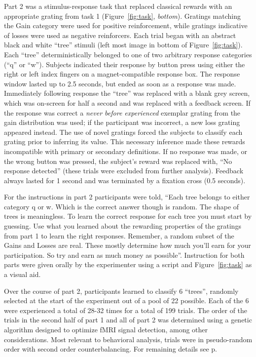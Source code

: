 \documentclass[doc,12pt]{apa}        %
\begin{document}
Part 2 was a stimulus-response task that replaced classical rewards with an appropriate grating from task 1 (Figure~\ref{fig:task}, \emph{bottom}).  Gratings matching the Gain category were used for positive reinforcement, while gratings indicative of losses were used as negative reinforcers.   Each trial began with an abstract black and white ``tree'' stimuli (left most image in bottom of Figure~\ref{fig:task}).  Each ``tree'' deterministically belonged to one of two arbitrary response categories (``q'' or ``w'').  Subjects indicated their response by button press using either the right or left index fingers on a magnet-compatible response box.  The response window lasted up to 2.5 seconds, but ended as soon as a response was made.  Immediately following response the ``tree'' was replaced with a blank grey screen, which was on-screen for half a second and was replaced with a feedback screen.  If the response was correct a \emph{never before experienced} exemplar grating from the gain distribution was used; if the participant was incorrect, a new loss grating appeared instead.  The use of novel gratings forced the subjects to classify each grating prior to inferring its value.  This necessary inference made these rewards incompatible with primary or secondary definitions.  If no response was made, or the wrong button was pressed, the subject's reward was replaced with, ``No response detected'' (these trials were excluded from further analysis).  Feedback always lasted for 1 second and was terminated by a fixation cross (0.5 seconds).  

For the instructions in part 2 participants were told, ``Each tree belongs to either category q or w.  Which is the correct answer though is random.  The shape of trees is meaningless.  To learn the correct response for each tree you must start by guessing.  Use what you learned about the rewarding properties of the gratings from part 1 to learn the right responses.  Remember, a random subset of the Gains and Losses are real.  These mostly determine how much you'll earn for your participation.  So try and earn as much money as possible''.  Instruction for both parts were given orally by the experimenter using a script and Figure~\ref{fig:task} as a visual aid.

Over the course of part 2, participants learned to classify 6 ``trees'', randomly selected at the start of the experiment out of a pool of 22 possible.  Each of the 6 were experienced a total of 28-32 times for a total of 199 trials. The order of the trials in the second half of part 1 and all of part 2 was determined using a genetic algorithm designed to optimize fMRI signal detection, among other considerations.  Most relevant to behavioral analysis, trials were in pseudo-random order with second order counterbalancing.  For remaining details see p\pageref{sub:acquired}.
\end{document}
